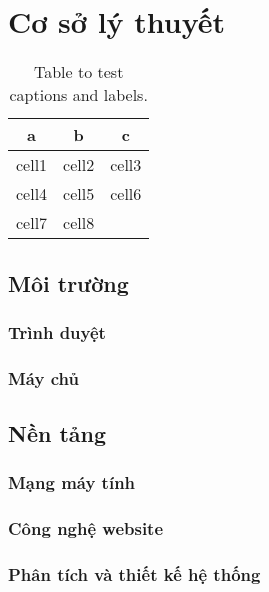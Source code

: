 \chapter{Cơ sở lý thuyết}


\blindtext

\begin{table}[h]
	\begin{center}
	\begin{tabular}{ |c|c|c| } 
		\hline
		a & b & c \\
		\hline
		cell1 & cell2 & cell3 \\ 
		cell4 & cell5 & cell6 \\ 
		cell7 & cell8 & \dotfill \\ 
		\hline
	\end{tabular}
		\caption{Table to test captions and labels.}
		\label{table:1}
	\end{center}
\end{table}

\section{Môi trường}

\subsection{Trình duyệt}
\blindtext

\subsection{Máy chủ}
\blindtext


\section{Nền tảng}
\subsection{Mạng máy tính}
\blindtext
\subsection{Công nghệ website}
\blindtext
\subsection{Phân tích và thiết kế hệ thống}
\blindtext
